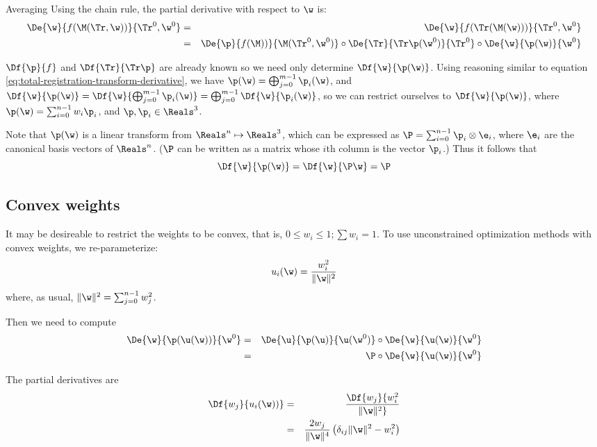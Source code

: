 \begin{plSection}{Averaging}
Using the chain rule, the partial derivative with respect to $\w$ is:
\begin{eqnarray}
\De{\w}{f(\M(\Tr,\w))}{\Tr^0,\w^0}
& = &
\De{\w}{f(\Tr(\M(\w)))}{\Tr^0,\w^0}
\\
& = &
\De{\p}{f(\M))}{\M(\Tr^0,\w^0)}
\circ
\De{\Tr}{\Tr\p(\w^0)}{\Tr^0}
\circ
\De{\w}{\p(\w)}{\w^0}
\nonumber
\end{eqnarray}

$\Df{\p}{f}$ and $\Df{\Tr}{\Tr\p}$ are already known
so we need only determine $\Df{\w}{\p(\w)}$.
Using reasoning similar
to equation \ref{eq:total-registration-transform-derivative},
we have $\p(\w) = \bigoplus_{j=0}^{m-1} \p_i(\w)$,
and
$\Df{\w}{\p(\w)}
=
\Df{\w}{\bigoplus_{j=0}^{m-1} \p_i(\w)}
=
\bigoplus_{j=0}^{m-1} \Df{\w}{\p_i(\w)}$,
so we can restrict ourselves to
$\Df{\w}{\p(\w)}$, where $\p(\w) = \sum_{i=0}^{n-1} w_i \p_i$,
and $\p, \p_i \in \Reals^3$.

Note that $\p(\w)$ is a linear transform from $\Reals^n \mapsto \Reals^3$,
which can be expressed as $\P = \sum_{i=0}^{n-1} \p_i \otimes \e_i$,
where $\e_i$ are the canonical basis vectors of $\Reals^n$.
($\P$ can be written as a matrix whose $i$th column is the vector $\p_i$.)
Thus it follows that
\begin{equation}
\Df{\w}{\p(\w)} = \Df{\w}{\P\w} = \P
\end{equation}

\subsection{Convex weights}
\label{sec:Convex-weights}

It may be desireable to restrict the weights to be convex,
that is, $0 \leq w_i \leq 1; \sum w_i = 1$.
To use unconstrained optimization methods with convex weights,
we re-parameterize:
\begin{equation}
u_i(\w) = {{w_i^2} \over {\| \w \|^2}}
\end{equation}
where, as usual, $\| \w \|^2 = \sum_{j=0}^{n-1} w_j^2$.

Then we need to compute
\begin{eqnarray}
\De{\w}{\p(\u(\w))}{\w^0}
& = &
\De{\u}{\p(\u)}{\u(\w^0)}
\circ
\De{\w}{\u(\w)}{\w^0}
\\
& = &
\P
\circ
\De{\w}{\u(\w)}{\w^0}
\nonumber
\end{eqnarray}

The partial derivatives are
\begin{eqnarray}
\Df{w_j}{u_i(\w))}
& = &
\Df{w_j}{{w_i^2} \over {\| \w \|^2}}
\\
& = &
{{2 w_j} \over {\| \w \|^4}} \left( \delta_{ij} \| \w \|^2 - w_i^2 \right)
\nonumber
\end{eqnarray}
\end{plSection}%
